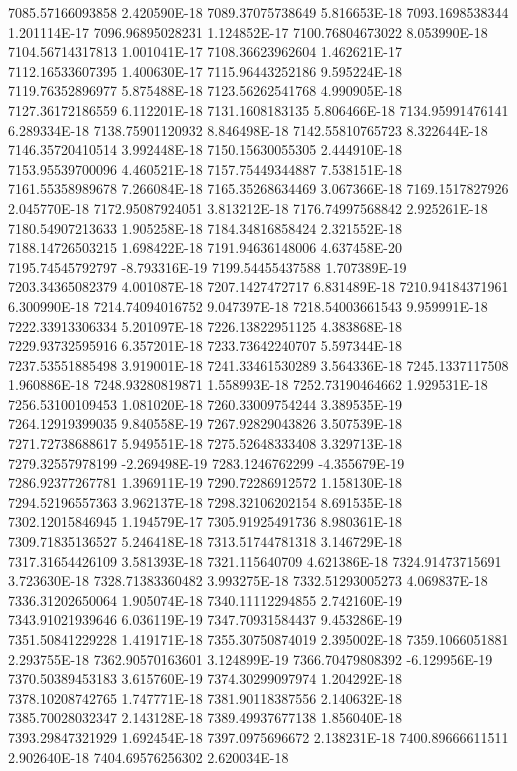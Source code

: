 7085.57166093858  2.420590E-18
7089.37075738649  5.816653E-18
7093.1698538344  1.201114E-17
7096.96895028231  1.124852E-17
7100.76804673022  8.053990E-18
7104.56714317813  1.001041E-17
7108.36623962604  1.462621E-17
7112.16533607395  1.400630E-17
7115.96443252186  9.595224E-18
7119.76352896977  5.875488E-18
7123.56262541768  4.990905E-18
7127.36172186559  6.112201E-18
7131.1608183135  5.806466E-18
7134.95991476141  6.289334E-18
7138.75901120932  8.846498E-18
7142.55810765723  8.322644E-18
7146.35720410514  3.992448E-18
7150.15630055305  2.444910E-18
7153.95539700096  4.460521E-18
7157.75449344887  7.538151E-18
7161.55358989678  7.266084E-18
7165.35268634469  3.067366E-18
7169.1517827926  2.045770E-18
7172.95087924051  3.813212E-18
7176.74997568842  2.925261E-18
7180.54907213633  1.905258E-18
7184.34816858424  2.321552E-18
7188.14726503215  1.698422E-18
7191.94636148006  4.637458E-20
7195.74545792797  -8.793316E-19
7199.54455437588  1.707389E-19
7203.34365082379  4.001087E-18
7207.1427472717  6.831489E-18
7210.94184371961  6.300990E-18
7214.74094016752  9.047397E-18
7218.54003661543  9.959991E-18
7222.33913306334  5.201097E-18
7226.13822951125  4.383868E-18
7229.93732595916  6.357201E-18
7233.73642240707  5.597344E-18
7237.53551885498  3.919001E-18
7241.33461530289  3.564336E-18
7245.1337117508  1.960886E-18
7248.93280819871  1.558993E-18
7252.73190464662  1.929531E-18
7256.53100109453  1.081020E-18
7260.33009754244  3.389535E-19
7264.12919399035  9.840558E-19
7267.92829043826  3.507539E-18
7271.72738688617  5.949551E-18
7275.52648333408  3.329713E-18
7279.32557978199  -2.269498E-19
7283.1246762299  -4.355679E-19
7286.92377267781  1.396911E-19
7290.72286912572  1.158130E-18
7294.52196557363  3.962137E-18
7298.32106202154  8.691535E-18
7302.12015846945  1.194579E-17
7305.91925491736  8.980361E-18
7309.71835136527  5.246418E-18
7313.51744781318  3.146729E-18
7317.31654426109  3.581393E-18
7321.115640709  4.621386E-18
7324.91473715691  3.723630E-18
7328.71383360482  3.993275E-18
7332.51293005273  4.069837E-18
7336.31202650064  1.905074E-18
7340.11112294855  2.742160E-19
7343.91021939646  6.036119E-19
7347.70931584437  9.453286E-19
7351.50841229228  1.419171E-18
7355.30750874019  2.395002E-18
7359.1066051881  2.293755E-18
7362.90570163601  3.124899E-19
7366.70479808392  -6.129956E-19
7370.50389453183  3.615760E-19
7374.30299097974  1.204292E-18
7378.10208742765  1.747771E-18
7381.90118387556  2.140632E-18
7385.70028032347  2.143128E-18
7389.49937677138  1.856040E-18
7393.29847321929  1.692454E-18
7397.0975696672  2.138231E-18
7400.89666611511  2.902640E-18
7404.69576256302  2.620034E-18
